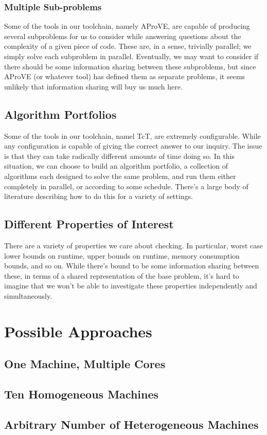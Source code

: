 \documentclass{article}
\begin{document}
\subsubsection{Multiple Sub-problems}
Some of the tools in our toolchain, namely AProVE, are capable of producing
several subproblems for us to consider while answering questions about the
complexity of a given piece of code.  These are, in a sense, trivially
parallel; we simply solve each subproblem in parallel.  Eventually, we may want
to consider if there should be some information sharing between these
subproblems, but since AProVE (or whatever tool) has defined them as separate
problems, it seems unlikely that information sharing will buy us much here.

\subsection{Algorithm Portfolios}
Some of the tools in our toolchain, namel TcT, are extremely configurable.
While any configuration is capable of giving the correct answer to our
inquiry. The issue is that they can take radically different amounts of time
doing so.  In this situation, we can choose to build an algorithm portfolio, a
collection of algorithms each designed to solve the same problem, and run them
either completely in parallel, or according to some schedule.  There's a large
body of literature describing how to do this for a variety of settings.

\subsection{Different Properties of Interest}
There are a variety of properties we care about checking.  In particular, worst
case lower bounds on runtime, upper bounds on runtime, memory consumption
bounds, and so on.  While there's bound to be some information sharing between
these, in terms of a shared representation of the base problem, it's hard to
imagine that we won't be able to investigate these properties independently and
simultaneously.

\section{Possible Approaches}
\subsection{One Machine, Multiple Cores}
\subsection{Ten Homogeneous Machines}
\subsection{Arbitrary Number of Heterogeneous Machines}
\end{document}

